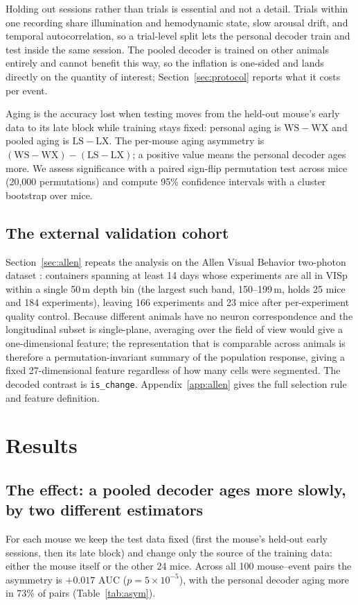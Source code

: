 \documentclass[mlmain,onecolumn]{jmlr}
\newcommand{\auc}{\mathrm{AUC}}
\begin{document}
Holding out sessions rather than trials is essential and not a detail. Trials within one recording
share illumination and hemodynamic state, slow arousal drift, and temporal autocorrelation, so a
trial-level split lets the personal decoder train and test inside the same session. The pooled
decoder is trained on other animals entirely and cannot benefit this way, so the inflation is
one-sided and lands directly on the quantity of interest; Section~\ref{sec:protocol} reports what it
costs per event.

Aging is the accuracy lost when testing moves from the held-out mouse's early data to its late block
while training stays fixed: personal aging is $\mathrm{WS}-\mathrm{WX}$ and pooled aging is
$\mathrm{LS}-\mathrm{LX}$. The per-mouse aging asymmetry is
$(\mathrm{WS}-\mathrm{WX})-(\mathrm{LS}-\mathrm{LX})$; a positive value means the personal decoder
ages more. We assess significance with a paired sign-flip permutation test across mice
(20{,}000 permutations) and compute 95\% confidence intervals with a cluster bootstrap over mice.

\subsection{The external validation cohort}
\label{sec:allencohort}
Section~\ref{sec:allen} repeats the analysis on the Allen Visual Behavior two-photon dataset
\citep{allenvb2023}: containers spanning at least 14 days whose experiments are all in VISp within a
single 50\,\textmu m depth bin (the largest such band, 150--199\,\textmu m, holds 25 mice and 184
experiments), leaving 166 experiments and 23 mice after per-experiment quality control. Because
different animals have no neuron correspondence and the longitudinal subset is single-plane,
averaging over the field of view would give a one-dimensional feature; the representation that is
comparable across animals is therefore a permutation-invariant summary of the population response,
giving a fixed 27-dimensional feature regardless of how many cells were segmented. The decoded
contrast is \texttt{is\_change}. Appendix~\ref{app:allen} gives the full selection rule and feature
definition.

\section{Results}

\subsection{The effect: a pooled decoder ages more slowly, by two different estimators}
\label{sec:asym}
\label{sec:decay}
For each mouse we keep the test data fixed (first the mouse's held-out early sessions, then its late
block) and change only the source of the training data: either the mouse itself or the other 24 mice.
Across all 100 mouse--event pairs the asymmetry is $+0.017$ $\auc$ ($p = 5 \times 10^{-5}$), with the
personal decoder aging more in 73\% of pairs (Table~\ref{tab:asym}).
\end{document}
